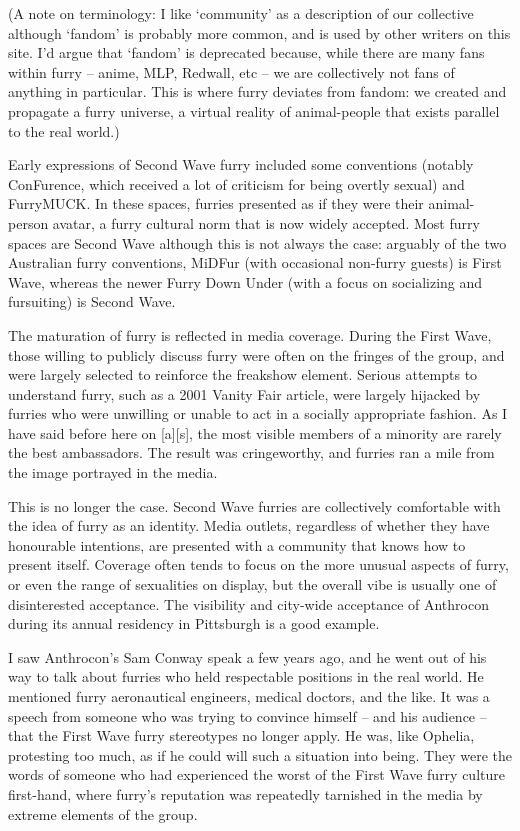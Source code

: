 (A note on terminology: I like `community' as a description of our collective although `fandom' is probably more common, and is used by other writers on this site. I'd argue that `fandom' is deprecated because, while there are many fans within furry -- anime, MLP, Redwall, etc -- we are collectively not fans of anything in particular. This is where furry deviates from fandom: we created and propagate a furry universe, a virtual reality of animal-people that exists parallel to the real world.)

Early expressions of Second Wave furry included some conventions (notably ConFurence, which received a lot of criticism for being overtly sexual) and FurryMUCK. In these spaces, furries presented as if they were their animal-person avatar, a furry cultural norm that is now widely accepted. Most furry spaces are Second Wave although this is not always the case: arguably of the two Australian furry conventions, MiDFur (with occasional non-furry guests) is First Wave, whereas the newer Furry Down Under (with a focus on socializing and fursuiting) is Second Wave.

The maturation of furry is reflected in media coverage. During the First Wave, those willing to publicly discuss furry were often on the fringes of the group, and were largely selected to reinforce the freakshow element. Serious attempts to understand furry, such as a 2001 Vanity Fair article, were largely hijacked by furries who were unwilling or unable to act in a socially appropriate fashion. As I have said before here on [a][s], the most visible members of a minority are rarely the best ambassadors. The result was cringeworthy, and furries ran a mile from the image portrayed in the media.

This is no longer the case. Second Wave furries are collectively comfortable with the idea of furry as an identity. Media outlets, regardless of whether they have honourable intentions, are presented with a community that knows how to present itself. Coverage often tends to focus on the more unusual aspects of furry, or even the range of sexualities on display, but the overall vibe is usually one of disinterested acceptance. The visibility and city-wide acceptance of Anthrocon during its annual residency in Pittsburgh is a good example.

I saw Anthrocon's Sam Conway speak a few years ago, and he went out of his way to talk about furries who held respectable positions in the real world. He mentioned furry aeronautical engineers, medical doctors, and the like. It was a speech from someone who was trying to convince himself -- and his audience -- that the First Wave furry stereotypes no longer apply. He was, like Ophelia, protesting too much, as if he could will such a situation into being. They were the words of someone who had experienced the worst of the First Wave furry culture first-hand, where furry's reputation was repeatedly tarnished in the media by extreme elements of the group.

